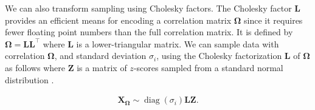 \documentclass[../../../main.tex]{subfiles}
\begin{document}
We can also transform sampling using Cholesky factors. The Cholesky factor $\bm{L}$ provides an efficient means for encoding a correlation matrix $\bm{\Omega}$ since it requires fewer floating point numbers than the full correlation matrix. It is defined by $\bm{\Omega}=\bm{L}\bm{L}^\top$ where $\bm{L}$ is a lower-triangular matrix. We can sample data with correlation $\bm{\Omega}$, and standard deviation $\sigma_i$, using the Cholesky factorization $\bm{L}$ of $\bm{\Omega}$ as follows where $\bm{Z}$ is a matrix of $z$-scores sampled from a standard normal distribution \autocite{McElreath2020, Stansbury2024}.

\begin{align*}
\bm{X_\Omega} \sim \operatorname{diag}(\sigma_i)\bm{L}\bm{Z}.
\end{align*}
\end{document}
